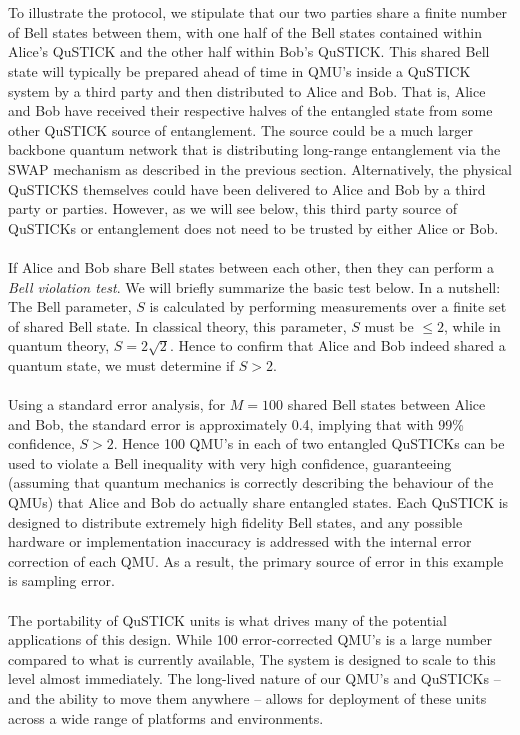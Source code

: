 \documentclass[aps,prl,twocolumn,10pt,nofootinbib]{revtex4}
\begin{document}
\\
\\
To illustrate the protocol, we stipulate that our two parties share a finite number of Bell states between them, with one half of the Bell states contained within Alice's QuSTICK and the other half within Bob's QuSTICK.  This shared Bell state  will typically be prepared ahead of time in QMU's inside a QuSTICK system by a third party and then distributed to Alice and Bob.  That is, Alice and Bob have received their respective halves of the entangled state from some other QuSTICK source of entanglement.  The source could be a much larger backbone quantum network that is distributing long-range entanglement via the SWAP mechanism as described in the previous section.  Alternatively, the physical QuSTICKS themselves could have been delivered to Alice and Bob by a third party or parties.  However, as we will see below, this third party source of QuSTICKs or entanglement does not need to be trusted by either Alice or Bob.
\\
\\
If Alice and Bob share Bell states between each other, then they can perform a {\em Bell violation test}.  We will briefly summarize the basic test below.  In a nutshell: The Bell parameter, $S$ is calculated by performing measurements over a finite set of shared Bell state.  In classical theory, this parameter, $S$ must be $\leq 2$, while in quantum theory, $S=2\sqrt{2}$.  Hence to confirm that Alice and Bob indeed shared a quantum state, we must determine if $S>2$.
\\
\\
Using a standard error analysis, for $M = 100$ shared Bell states between Alice and Bob, the standard error is approximately 0.4, implying that with 99\% confidence, $S > 2$.  Hence 100 QMU's in each of two entangled QuSTICKs can be used to violate a Bell inequality with very high confidence, guaranteeing (assuming that quantum mechanics is correctly describing the behaviour of the QMUs) that Alice and Bob do actually share entangled states.  Each QuSTICK is designed to distribute extremely high fidelity Bell states, and any possible hardware or implementation inaccuracy is addressed with the internal error correction of each QMU.  As a result, the primary source of error in this example is sampling error.
\\
\\
The portability of QuSTICK units is what drives many of the potential applications of this design.  While 100 error-corrected QMU's is a large number compared to what is currently available, The system is designed to scale to this level almost immediately.  The long-lived nature of our QMU's and QuSTICKs -- and the ability to move them anywhere -- allows for deployment of these units across a wide range of platforms and environments.  
\end{document}
